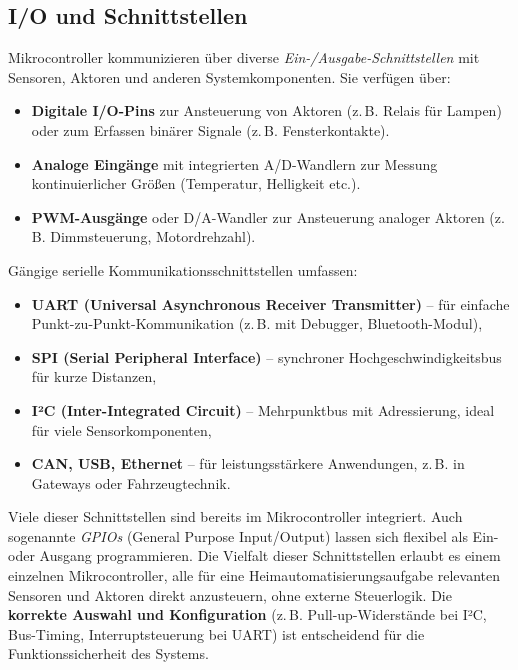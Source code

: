 \subsection*{I/O und Schnittstellen}
Mikrocontroller kommunizieren über diverse \emph{Ein-/Ausgabe-Schnittstellen} mit Sensoren, Aktoren und anderen Systemkomponenten. Sie verfügen über:
\begin{itemize}
  \item \textbf{Digitale I/O-Pins} zur Ansteuerung von Aktoren (z.\,B. Relais für Lampen) oder zum Erfassen binärer Signale (z.\,B. Fensterkontakte).
  \item \textbf{Analoge Eingänge} mit integrierten A/D-Wandlern zur Messung kontinuierlicher Größen (Temperatur, Helligkeit etc.).
  \item \textbf{PWM-Ausgänge} oder D/A-Wandler zur Ansteuerung analoger Aktoren (z.\,B. Dimmsteuerung, Motordrehzahl).
\end{itemize}
Gängige serielle Kommunikationsschnittstellen umfassen:
\begin{itemize}
  \item \textbf{UART (Universal Asynchronous Receiver Transmitter)} – für einfache Punkt-zu-Punkt-Kommunikation (z.\,B. mit Debugger, Bluetooth-Modul),
  \item \textbf{SPI (Serial Peripheral Interface)} – synchroner Hochgeschwindigkeitsbus für kurze Distanzen,
  \item \textbf{I²C (Inter-Integrated Circuit)} – Mehrpunktbus mit Adressierung, ideal für viele Sensorkomponenten,
  \item \textbf{CAN, USB, Ethernet} – für leistungsstärkere Anwendungen, z.\,B. in Gateways oder Fahrzeugtechnik. 
\end{itemize}
\autocite{Microcontroller_vs_Microprocessor}
Viele dieser Schnittstellen sind bereits im Mikrocontroller integriert. \autocite{Microcontroller_vs_Microprocessor} Auch sogenannte \emph{GPIOs} (General Purpose Input/Output) lassen sich flexibel als Ein- oder Ausgang programmieren. Die Vielfalt dieser Schnittstellen erlaubt es einem einzelnen Mikrocontroller, alle für eine Heimautomatisierungsaufgabe relevanten Sensoren und Aktoren direkt anzusteuern, ohne externe Steuerlogik. Die \textbf{korrekte Auswahl und Konfiguration} (z.\,B. Pull-up-Widerstände bei I²C, Bus-Timing, Interruptsteuerung bei UART) ist entscheidend für die Funktionssicherheit des Systems.

